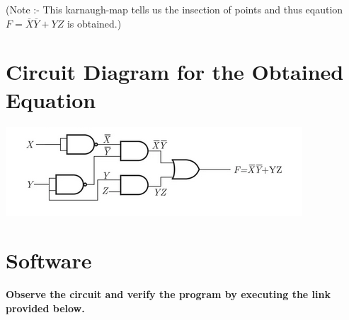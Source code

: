 \documentclass[10pt, a4paper]{article}
\begin{document}
(Note :- This karnaugh-map tells us the insection of points and thus eqaution $F = \overline{X}\overline{Y} + YZ$ is obtained.)


\section{Circuit Diagram for the Obtained Equation}

\includegraphics{circuit.png}
 
 
\section{Software}
\textbf{Observe the circuit and verify the program by executing the link provided below.}\\
\begin{center}
\end{center}
\end{document}

